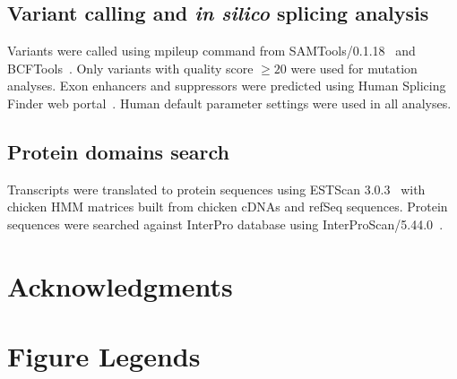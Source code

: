 \documentclass[10pt]{article}
\begin{document}
\subsection*{Variant calling and {\em in silico} splicing
analysis}

Variants were called using mpileup command from
SAMTools/0.1.18~\cite{li2009sequence} and
BCFTools~\cite{bcftools}.  Only variants with quality score
$\ge20$ were used for mutation analyses.  Exon enhancers and
suppressors were predicted using Human Splicing Finder web
portal~\cite{desmet2009human}.  Human default parameter settings
were used in all analyses. 

\subsection*{Protein domains search}

Transcripts were translated to protein sequences using ESTScan
3.0.3~\cite{iseli1999estscan} with chicken HMM matrices built
from chicken cDNAs and refSeq sequences. Protein sequences were
searched against InterPro database using
InterProScan/5.44.0~\cite{quevillon2005interproscan}.

\section*{Acknowledgments}

{}

\section*{Figure Legends}
\end{document}
